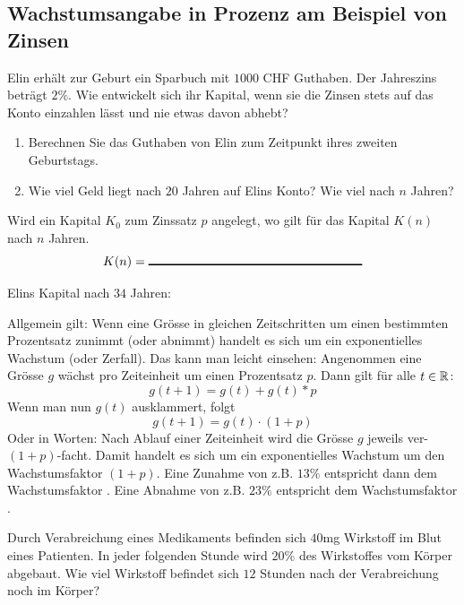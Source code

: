 \documentclass[11pt,oneside]{article}
\begin{document}
\subsection{Wachstumsangabe in Prozenz am Beispiel von Zinsen}
	\vspace{5pt}
	\begin{aufgabe}
		Elin erhält zur Geburt ein Sparbuch mit $1000$ CHF Guthaben. Der Jahreszins beträgt $2\%$. Wie entwickelt sich ihr Kapital, wenn sie die Zinsen stets auf das Konto einzahlen lässt und nie etwas davon abhebt?
		\begin{enumerate}[label=\alph*)]
			\item Berechnen Sie das Guthaben von Elin zum Zeitpunkt ihres zweiten Geburtstags.
			\item Wie viel Geld liegt nach $20$ Jahren auf Elins Konto? Wie viel nach $n$ Jahren?
		\end{enumerate}
	\end{aufgabe}
	\begin{satz}
		Wird ein Kapital $K_0$ zum Zinssatz $p$ angelegt, wo gilt für das Kapital $K(n)$ nach $n$ Jahren.
		\[K(n)=\gap{6}\]
	\end{satz}
	\begin{beispiel}
		Elins Kapital nach $34$ Jahren:\vspace{5pt}\newline{}
	\end{beispiel}
	Allgemein gilt: Wenn eine Grösse in gleichen Zeitschritten um einen bestimmten Prozentsatz zunimmt (oder abnimmt) handelt es sich um ein exponentielles Wachstum (oder Zerfall). Das kann man leicht einsehen: Angenommen eine Grösse $g$ wächst pro Zeiteinheit um einen Prozentsatz $p$. Dann gilt für alle $t\in\mathbb{R}$:
	\[g(t+1)=g(t)+g(t)*p\]
	Wenn man nun $g(t)$ ausklammert, folgt
	\[g(t+1)=g(t)\cdot (1+p)\]
	Oder in Worten: Nach Ablauf einer Zeiteinheit wird die Grösse $g$ jeweils ver-$(1+p)$-facht. Damit handelt es sich um ein exponentielles Wachstum um den Wachstumsfaktor $(1+p)$.\newline
	Eine Zunahme von z.B. $13\%$ entspricht dann dem Wachstumsfaktor . \newline
	Eine Abnahme von z.B. $23\%$ entspricht dem Wachstumsfaktor \gap{4}.
	\begin{beispiel}
		Durch Verabreichung eines Medikaments befinden sich $40$mg Wirkstoff im Blut eines Patienten. In jeder folgenden Stunde wird $20\%$ des Wirkstoffes vom Körper abgebaut. Wie viel Wirkstoff befindet sich $12$ Stunden nach der Verabreichung noch im Körper?\vspace{5pt}\newline\karos{6}
	\end{beispiel}
\end{document}
